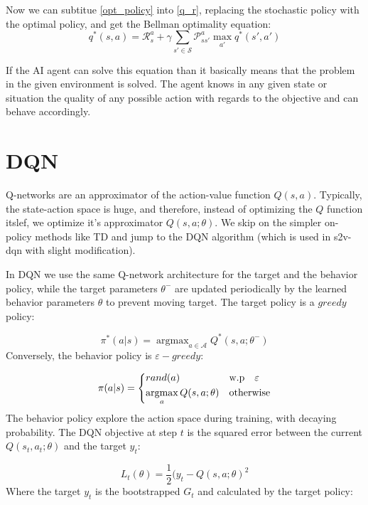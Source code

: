 \documentclass[10pt,a4paper,draft]{article}
\DeclareMathOperator*{\argmax}{argmax}
\begin{document}
Now we can subtitue \eqref{opt_policy} into \eqref{q_r}, replacing the stochastic policy with the optimal policy, and get the Bellman optimality equation:
\begin{equation}
q^*(s,a) = \mathcal{R}_s^a + \gamma\sum_{s' \in \mathcal{S}} \mathcal{P}_{ss'}^a \max_{a'} q^*(s',a')
\label{bellman_opt_q_eq}
\end{equation}

If the AI agent can solve this equation than it basically means that the problem in the given environment is solved. The agent knows in any given state or situation the quality of any possible action with regards to the objective and can behave accordingly.

\section{DQN}

Q-networks are an approximator of the action-value function $Q(s,a)$. Typically, the state-action space is huge, and therefore, instead of optimizing the $Q$ function itslef, we optimize it's approximator $Q(s,a;\theta)$. We skip on the simpler on-policy methods like TD and jump to the DQN algorithm \cite{dqn2013}(which is used in s2v-dqn with slight modification).

In DQN we use the same Q-network architecture for the target and the behavior policy, while the target parameters $\theta^-$ are updated periodically by the learned behavior parameters $\theta$ to prevent moving target. The target policy is a $greedy$ policy:

\begin{equation}
\pi^*(a|s) = \argmax_{a \in \mathcal{A}}{Q^*(s,a;\theta^-)}
\label{dqn-target-policy}
\end{equation}
Conversely, the behavior policy is $\varepsilon-greedy$:

\begin{equation}
\pi(a|s) = 
\begin{dcases}
    rand(a) 					& \text{w.p  \ \ } \varepsilon \\
    \argmax_a{Q(s,a;\theta)} 	& \text{otherwise}
\end{dcases}
\label{dqn-behavior-policy}
\end{equation}
The behavior policy explore the action space during training, with decaying probability. The DQN objective at step $t$ is the squared error between the current $Q(s_t,a_t;\theta)$ and the target $y_t$:

\begin{equation}
L_t(\theta) = \dfrac{1}{2}(y_t - Q(s,a;\theta)^2
\label{dqn_objective}
\end{equation}
Where the target $y_t$ is the bootstrapped $G_t$ and calculated by the target policy:
\end{document}

